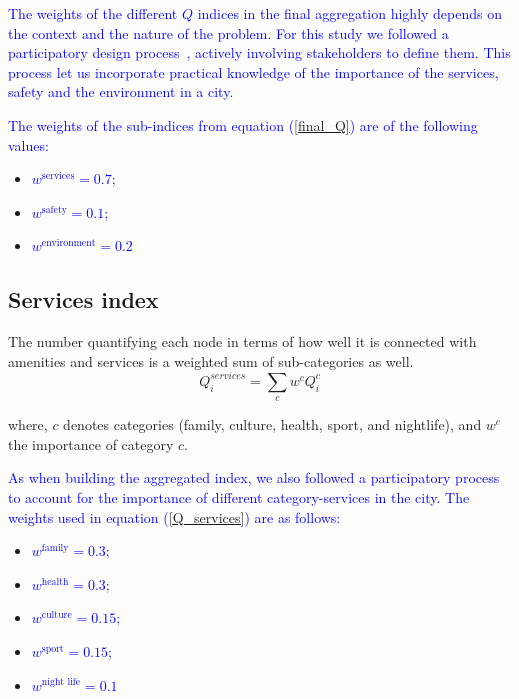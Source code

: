 \textcolor{blue}{The weights of the different $Q$ indices in the final aggregation highly depends on the context and the nature of the problem. For this study we followed a participatory design process~\cite{kunze2011conceptual,gaziulusoy2017shifting,heitlinger2018avoiding}, actively involving stakeholders to define them. This process let us incorporate practical knowledge of the importance of the services, safety and the environment in a city.}

\textcolor{blue}{The weights of the sub-indices from equation (\ref{final_Q}) are of the following values:}

\begin{itemize}
  \item \textcolor{blue}{$w^{\text{services}}=0.7$;}
  \item \textcolor{blue}{$w^{\text{safety}}=0.1$;}
  \item \textcolor{blue}{$w^{\text{environment}}=0.2$}
\end{itemize}

\subsection{Services index}
The number quantifying each node in terms of how well it is connected with amenities and services is a weighted sum of sub-categories as well.
\begin{equation}\label{Q_services}
	Q_i^{services} =\sum_c w^c Q_i^c
\end{equation}

where, $c$ denotes categories (family, culture, health, sport, and nightlife), and $w^c$ the importance of category $c$. %

\textcolor{blue}{As when building the aggregated index, we also followed a participatory process to account for the importance of different category-services in the city. The weights used in equation (\ref{Q_services}) are as follows:}

\begin{itemize}
  \item \textcolor{blue}{$w^{\text{family}}= 0.3$;}
  \item \textcolor{blue}{$w^{\text{health}}= 0.3$;}
  \item \textcolor{blue}{$w^{\text{culture}} = 0.15$;}
  \item \textcolor{blue}{$w^{\text{sport}} = 0.15$;}
  \item \textcolor{blue}{$w^{\text{night life}}=0.1$}
\end{itemize}

